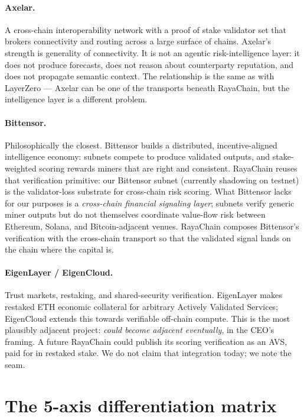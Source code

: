 \documentclass[11pt,a4paper]{article}
\begin{document}
\paragraph{Axelar.} A cross-chain interoperability network with a proof
of stake validator set that brokers connectivity and routing across a
large surface of chains. Axelar's strength is generality of
connectivity. It is not an agentic risk-intelligence layer: it does
not produce forecasts, does not reason about counterparty reputation,
and does not propagate semantic context. The relationship is the same
as with LayerZero --- Axelar can be one of the transports beneath
RayaChain, but the intelligence layer is a different problem.

\paragraph{Bittensor.} Philosophically the closest. Bittensor builds a
distributed, incentive-aligned intelligence economy: subnets compete
to produce validated outputs, and stake-weighted scoring rewards
miners that are right and consistent. RayaChain reuses that
verification primitive: our Bittensor subnet (currently shadowing on
testnet) is the validator-loss substrate for cross-chain risk scoring.
What Bittensor lacks for our purposes is a \emph{cross-chain financial
signaling layer}; subnets verify generic miner outputs but do not
themselves coordinate value-flow risk between Ethereum, Solana, and
Bitcoin-adjacent venues. RayaChain composes Bittensor's verification
with the cross-chain transport so that the validated signal lands on
the chain where the capital is.

\paragraph{EigenLayer / EigenCloud.} Trust markets, restaking, and
shared-security verification. EigenLayer makes restaked ETH economic
collateral for arbitrary Actively Validated Services; EigenCloud
extends this towards verifiable off-chain compute. This is the most
plausibly adjacent project: \emph{could become adjacent eventually},
in the CEO's framing. A future RayaChain could publish its scoring
verification as an AVS, paid for in restaked stake. We do not claim
that integration today; we note the seam.

\section*{The 5-axis differentiation matrix}
\label{sec:matrix}
\end{document}

